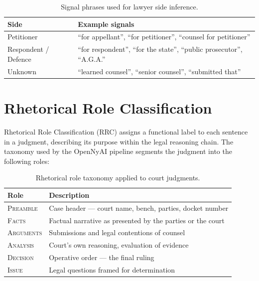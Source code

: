 \begin{table}[H]
\centering
\caption{Signal phrases used for lawyer side inference.}
\label{tab:lawyer-signals}
\begin{tabular}{@{}ll@{}}
\toprule
\textbf{Side} & \textbf{Example signals} \\
\midrule
Petitioner & ``for appellant'', ``for petitioner'', ``counsel for petitioner'' \\
Respondent / Defence & ``for respondent'', ``for the state'', ``public prosecutor'', ``A.G.A.'' \\
Unknown & ``learned counsel'', ``senior counsel'', ``submitted that'' \\
\bottomrule
\end{tabular}
\end{table}

\section{Rhetorical Role Classification}
\label{sec:rrc}

Rhetorical Role Classification (RRC) assigns a functional label to each sentence in a judgment, describing its purpose within the legal reasoning chain. The taxonomy used by the OpenNyAI pipeline segments the judgment into the following roles:

\begin{table}[H]
\centering
\caption{Rhetorical role taxonomy applied to court judgments.}
\label{tab:rr-roles}
\begin{tabular}{@{}lp{9cm}@{}}
\toprule
\textbf{Role} & \textbf{Description} \\
\midrule
\textsc{Preamble}   & Case header — court name, bench, parties, docket number \\
\textsc{Facts}      & Factual narrative as presented by the parties or the court \\
\textsc{Arguments}  & Submissions and legal contentions of counsel \\
\textsc{Analysis}   & Court's own reasoning, evaluation of evidence \\
\textsc{Decision}   & Operative order — the final ruling \\
\textsc{Issue}      & Legal questions framed for determination \\
\bottomrule
\end{tabular}
\end{table}

